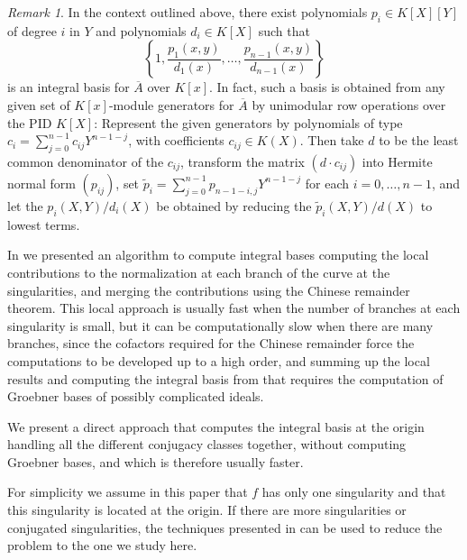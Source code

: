 \documentclass[a4paper,11pt]{amsart}%
\theoremstyle{definition}
\theoremstyle{plain}
\theoremstyle{remark}
\newtheorem{remark}[defn]{Remark}
\begin{document}
\begin{remark}
\label{rem:spec-int-basis}
In the context outlined above, there exist
polynomials $p_{i} \in K[X][Y]$ of degree $i$ in $Y$ and polynomials
$d_i\in K[X]$ such that
\[
\left\{1,\frac{p_{1}(x,y)}{d_1(x)},\dots,\frac{p_{n-1}(x,y)}{d_{n-1}(x)}\right\}
\]
is an integral basis %
 for $\overline{A}$ over $K[x]$. In fact, such a
basis is obtained from any given set of
$K[x]$-module generators for $\overline{A}$ by unimodular row operations over
the PID $K[X]$: Represent the given generators by polynomials of type
$c_{i}=\sum_{j=0}^{n-1}c_{ij}Y^{n-1-j}$, with coefficients $c_{ij}\in K(X)$.
Then take $d$ to be the least common denominator of the $c_{ij}$,
transform the matrix $(d\cdot c_{ij})$ into Hermite normal form $(p_{ij})$,
set $\widetilde{p}_{i}=\sum_{j=0}^{n-1}p_{n-1-i ,j}Y^{n-1-j}$ for each $i=0,\dots, n-1$,
and let the ${p}_{i}(X,Y)/d_i(X)$ be obtained by reducing the
$\widetilde{p}_{i}(X,Y)/d(X)$ to lowest terms.
\end{remark}

In \cite{intbas} we presented an algorithm to compute integral bases computing the local contributions to the normalization at each branch of the curve at the singularities, and merging the contributions using the Chinese remainder theorem. This local approach is usually fast when the number of branches at each singularity is small, but it can be computationally
slow when there are many branches, since the cofactors required for the Chinese remainder force the computations to be developed up to a high order, and summing up the local results and computing the integral basis from that requires the computation of Groebner bases of possibly complicated ideals.

We present a direct approach that computes the integral basis at the origin
handling all the different conjugacy classes together, without computing
Groebner bases, and which is therefore usually faster.

For simplicity we assume in this paper that $f$ has only one singularity and that this singularity is located at the origin.
If there are more singularities or conjugated singularities, the techniques presented in \cite{intbas} can be used to reduce the problem to the one we study here.
\end{document}
